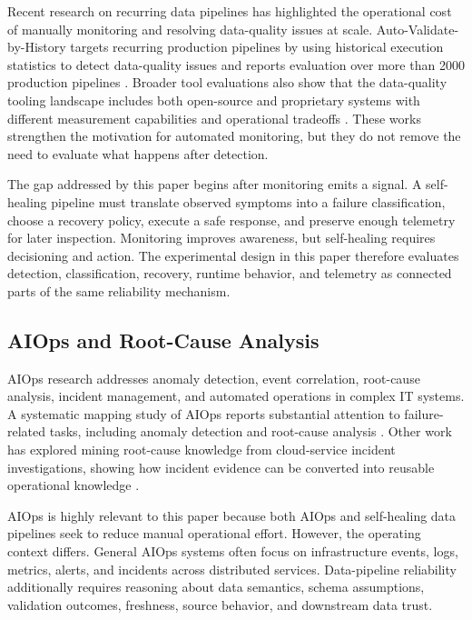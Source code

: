 Recent research on recurring data pipelines has highlighted the operational cost of manually monitoring and resolving data-quality issues at scale. Auto-Validate-by-History targets recurring production pipelines by using historical execution statistics to detect data-quality issues and reports evaluation over more than 2000 production pipelines \cite{tu2023autovalidate}. Broader tool evaluations also show that the data-quality tooling landscape includes both open-source and proprietary systems with different measurement capabilities and operational tradeoffs \cite{rehberger2026dqtools}. These works strengthen the motivation for automated monitoring, but they do not remove the need to evaluate what happens after detection.

The gap addressed by this paper begins after monitoring emits a signal. A self-healing pipeline must translate observed symptoms into a failure classification, choose a recovery policy, execute a safe response, and preserve enough telemetry for later inspection. Monitoring improves awareness, but self-healing requires decisioning and action. The experimental design in this paper therefore evaluates detection, classification, recovery, runtime behavior, and telemetry as connected parts of the same reliability mechanism.

\subsection{AIOps and Root-Cause Analysis}

AIOps research addresses anomaly detection, event correlation, root-cause analysis, incident management, and automated operations in complex IT systems. A systematic mapping study of AIOps reports substantial attention to failure-related tasks, including anomaly detection and root-cause analysis \cite{notaro2020aiops}. Other work has explored mining root-cause knowledge from cloud-service incident investigations, showing how incident evidence can be converted into reusable operational knowledge \cite{saha2022rootcause}.

AIOps is highly relevant to this paper because both AIOps and self-healing data pipelines seek to reduce manual operational effort. However, the operating context differs. General AIOps systems often focus on infrastructure events, logs, metrics, alerts, and incidents across distributed services. Data-pipeline reliability additionally requires reasoning about data semantics, schema assumptions, validation outcomes, freshness, source behavior, and downstream data trust.


